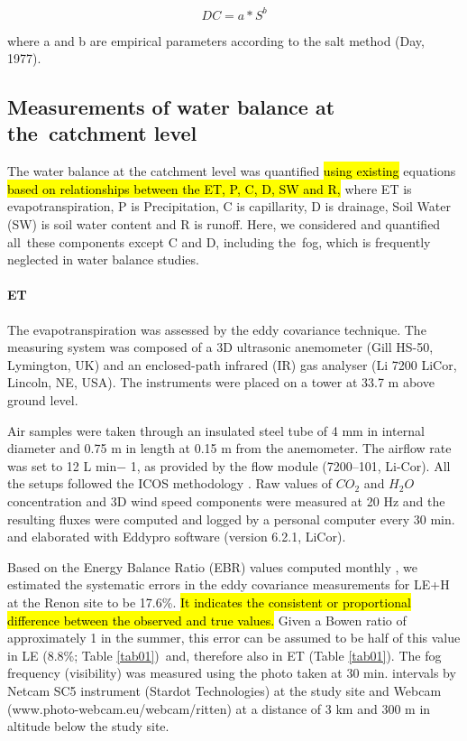 \documentclass[10pt,letterpaper]{article}
\begin{document}
\begin{equation}\label{eq06}
	DC = a * S^b 
\end{equation}

where a and b are empirical parameters according to the salt method (Day, 1977).  

\subsection{Measurements of water balance at the catchment level }

The water balance at the catchment level was quantified \hl{using existing} equations \hl{based on relationships between the ET, P, C, D, SW and R, }where ET is evapotranspiration, P is Precipitation, C is capillarity, D is drainage, Soil Water (SW) is soil water content and R is runoff. Here, we considered and quantified all these components except C and D, including the fog, which is frequently neglected in water balance studies.

\paragraph{ET}
The evapotranspiration was assessed by the eddy covariance technique. The measuring system was composed of a 3D ultrasonic anemometer (Gill HS-50, Lymington, UK) and an enclosed-path infrared (IR) gas analyser (Li 7200 LiCor, Lincoln, NE, USA). The instruments were placed on a tower at 33.7 m above ground level.

Air samples were taken through an insulated steel tube of 4 mm in internal diameter and 0.75 m in length at 0.15 m from the anemometer. The airflow rate was set to 12 L min− 1, as provided by the flow module (7200–101, Li-Cor). All the setups followed the ICOS methodology \cite{Rebmann2018}. Raw values of $CO_2$ and $H_{2}O$ concentration and 3D wind speed components were measured at 20 Hz and the resulting fluxes were computed and logged by a personal computer every 30 min. and elaborated with Eddypro software (version 6.2.1, LiCor). 

Based on the Energy Balance Ratio (EBR) values computed monthly \cite{GEORG201637,WOHLFAHRT20091556}, we estimated the systematic errors in the eddy covariance measurements for LE+H at the Renon site to be 17.6\%. \hl{It indicates the consistent or proportional difference between the observed and true values. }Given a Bowen ratio of approximately 1 in the summer, this error can be assumed to be half of this value in LE (8.8\%; Table \ref{tab01}) and, therefore also in ET (Table \ref{tab01}). The fog frequency (visibility) was measured using the photo taken at 30 min. intervals by Netcam SC5 instrument (Stardot Technologies) at the study site and Webcam (www.photo-webcam.eu/webcam/ritten) at a distance of 3 km and 300 m in altitude below the study site. 
\end{document}
